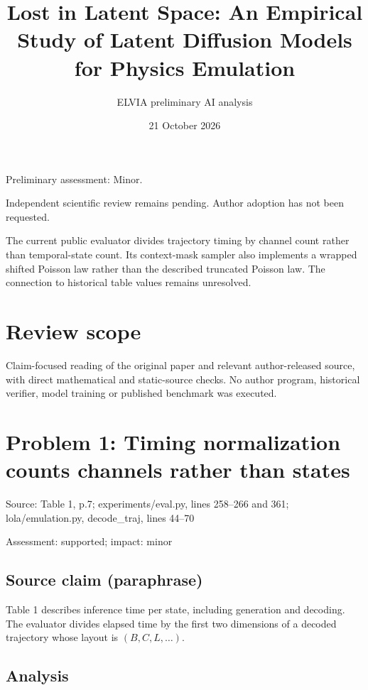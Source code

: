 \documentclass[11pt]{article}
\begin{document}
\title{Lost in Latent Space: An Empirical Study of Latent Diffusion Models for Physics Emulation}

\author{ELVIA preliminary AI analysis}\date{21 October 2026}\maketitle

Preliminary assessment: Minor.\par

Independent scientific review remains pending. Author adoption has not been requested.

The current public evaluator divides trajectory timing by channel count rather than temporal-state count. Its context-mask sampler also implements a wrapped shifted Poisson law rather than the described truncated Poisson law. The connection to historical table values remains unresolved.

\section*{Review scope}

Claim-focused reading of the original paper and relevant author-released source, with direct mathematical and static-source checks. No author program, historical verifier, model training or published benchmark was executed.

\section*{Problem 1: Timing normalization counts channels rather than states}

Source: Table 1, p.7; experiments/eval.py, lines 258–266 and 361; lola/emulation.py, decode\_traj, lines 44–70

Assessment: supported; impact: minor

\subsection*{Source claim (paraphrase)}

Table 1 describes inference time per state, including generation and decoding. The evaluator divides elapsed time by the first two dimensions of a decoded trajectory whose layout is \((B,C,L,\ldots)\).

\subsection*{Analysis}
\end{document}
